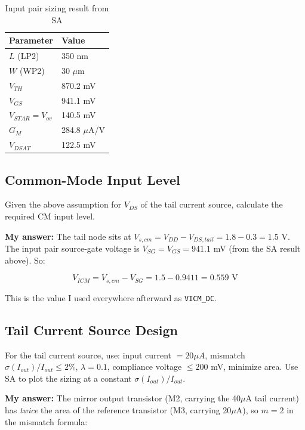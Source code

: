 \documentclass[11pt]{article}
\newcommand{\answer}[1]{
  \par\vspace{2pt}
  \noindent\textbf{\color{itiCrimson}My answer:} #1
  \vspace{6pt}
}
\begin{document}
\begin{table}[H]
\centering
\begin{tabular}{ll}
\toprule
\textbf{Parameter} & \textbf{Value} \\
\midrule
$L$ (LP2) & 350 nm \\
$W$ (WP2) & 30 $\mu$m \\
$V_{TH}$ & 870.2 mV \\
$V_{GS}$ & 941.1 mV \\
$V_{STAR}=V_{ov}$ & 140.5 mV \\
$G_M$ & 284.8 $\mu$A/V \\
$V_{DSAT}$ & 122.5 mV \\
\bottomrule
\end{tabular}
\caption{Input pair sizing result from SA}
\end{table}

\subsection{Common-Mode Input Level}
\begin{qbox}
Given the above assumption for $V_{DS}$ of the tail current source, calculate the required CM input level.
\end{qbox}
\answer{The tail node sits at $V_{s,cm}=V_{DD}-V_{DS,tail}=1.8-0.3=1.5$ V. The input pair source-gate voltage
is $V_{SG}=V_{GS}=941.1$ mV (from the SA result above). So:}

\begin{equation}
V_{ICM} = V_{s,cm} - V_{SG} = 1.5 - 0.9411 = \boxed{0.559\text{ V}}
\end{equation}

This is the value I used everywhere afterward as \texttt{VICM\_DC}.

\subsection{Tail Current Source Design}

\begin{qbox}
For the tail current source, use: input current $=20\mu A$, mismatch $\sigma(I_{out})/I_{out}\le2\%$,
$\lambda = 0.1$, compliance voltage $\le 200$ mV, minimize area. Use SA to plot the sizing at a constant
$\sigma(I_{out})/I_{out}$.
\end{qbox}
\answer{The mirror output transistor (M2, carrying the 40$\mu$A tail current) has \emph{twice} the area of
the reference transistor (M3, carrying 20$\mu$A), so $m=2$ in the mismatch formula:}
\end{document}

